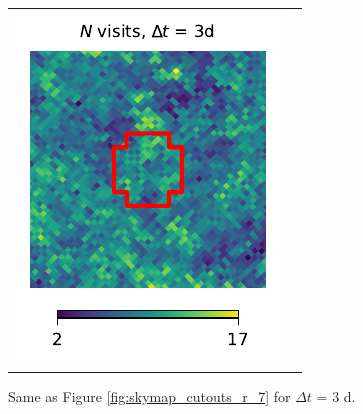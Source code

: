 \documentclass[preprintm,linenumbers]{aastex631}
\begin{document}
\begin{figure}
\begin{tabular}{@{}c@{}c@{}}
				\includegraphics{results/skymaps_cutout/skymaps_cutout_first_year_one_snap_v4_0_10yrs_db_noDD_noTwi_tscale-3_nside-256_doAllTemplateMetrics_reduceCount_r_WFD_noDD_noTwi.pdf} \\
			\end{tabular}
			\caption{
				 Same as Figure \ref{fig:skymap_cutouts_r_7} for $\Delta t$ = 3 d.  
			}
   \label{fig:skymap_cutouts_r_3}
		\end{figure}
        
\end{document}
